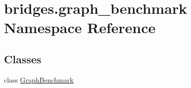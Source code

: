 \hypertarget{namespacebridges_1_1graph__benchmark}{}\section{bridges.\+graph\+\_\+benchmark Namespace Reference}
\label{namespacebridges_1_1graph__benchmark}
\subsection*{Classes}
\begin{DoxyCompactItemize}
\item 
class \mbox{\hyperlink{classbridges_1_1graph__benchmark_1_1_graph_benchmark}{Graph\+Benchmark}}
\end{DoxyCompactItemize}
